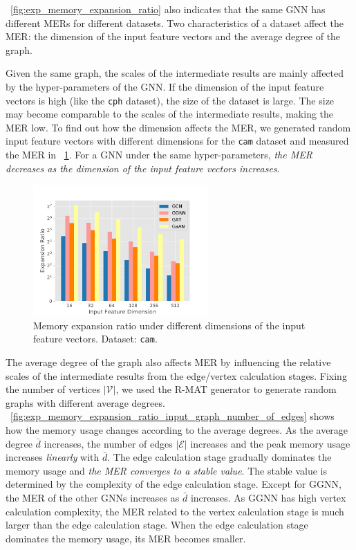 \figurename~\ref{fig:exp_memory_expansion_ratio} also indicates that the same GNN has different MERs for different datasets.
Two characteristics of a dataset affect the MER: the dimension of the input feature vectors and the average degree of the graph.

Given the same graph, the scales of the intermediate results are mainly affected by the hyper-parameters of the GNN.
If the dimension of the input feature vectors is high (like the \texttt{cph} dataset), the size of the dataset is large.
The size may become comparable to the scales of the intermediate results,  making the MER low.
To find out how the dimension affects the MER, we generated random input feature vectors with different dimensions for the \texttt{cam} dataset and measured the MER in \figurename~\ref{fig:exp_memory_expension_ratio_input_feature_dimension}.
For a GNN under the same hyper-parameters, \emph{the MER decreases as the dimension of the input feature vectors increases}.

\begin{figure}[h]
    \centering
    \includegraphics[height=5cm]{figs/experiments/exp_memory_expansion_ratio_input_feature_dimension_com-amazon.pdf}
    \caption{Memory expansion ratio under different dimensions of the input feature vectors. Dataset: \texttt{cam}.}
    \label{fig:exp_memory_expension_ratio_input_feature_dimension}
\end{figure}

The average degree of the graph also affects MER by influencing the relative scales of the intermediate results from the edge/vertex calculation stages.
Fixing the number of vertices $|\mathcal{V}|$, we used the R-MAT generator to generate random graphs with different average degrees.
\figurename~\ref{fig:exp_memory_expansion_ratio_input_graph_number_of_edges} shows how the memory usage changes according to the average degrees.
As the average degree $\bar{d}$ increases, the number of edges $|\mathcal{E}|$ increases and the peak memory usage increases \emph{linearly} with $\bar{d}$.
The edge calculation stage gradually dominates the memory usage and \emph{the MER converges to a stable value}.
The stable value is determined by the complexity of the edge calculation stage.
Except for GGNN, the MER of the other GNNs increases as $\bar{d}$ increases.
As GGNN has high vertex calculation complexity, the MER related to the vertex calculation stage is much larger than the edge calculation stage.
When the edge calculation stage dominates the memory usage, its MER becomes smaller.

